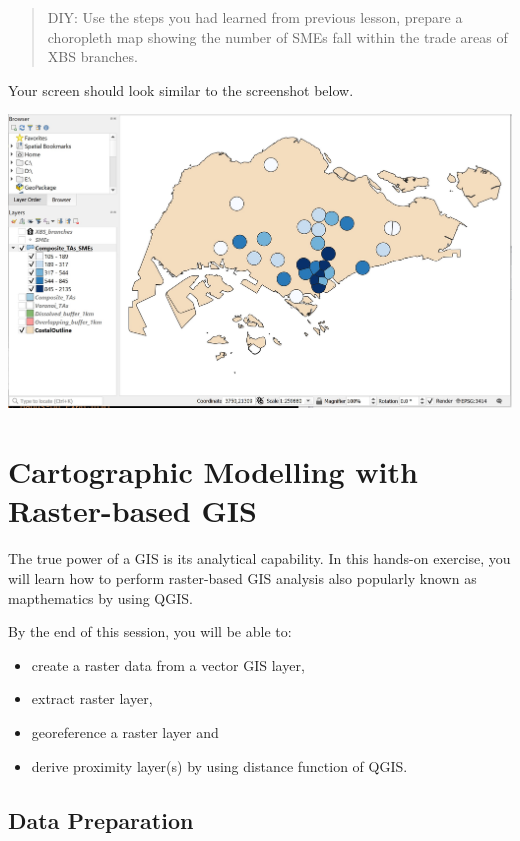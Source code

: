\documentclass[
  letterpaper,
  DIV=11,
  numbers=noendperiod]{scrreprt}
\begin{document}
\begin{quote}
DIY: Use the steps you had learned from previous lesson, prepare a
choropleth map showing the number of SMEs fall within the trade areas of
XBS branches.
\end{quote}

Your screen should look similar to the screenshot below.

\includegraphics{./img05/image28.jpg}


\hypertarget{cartographic-modelling-with-raster-based-gis}{%
\chapter{Cartographic Modelling with Raster-based
GIS}\label{cartographic-modelling-with-raster-based-gis}}

The true power of a GIS is its analytical capability. In this hands-on
exercise, you will learn how to perform raster-based GIS analysis also
popularly known as mapthematics by using QGIS.

By the end of this session, you will be able to:

\begin{itemize}
\item
  create a raster data from a vector GIS layer,
\item
  extract raster layer,
\item
  georeference a raster layer and
\item
  derive proximity layer(s) by using distance function of QGIS.
\end{itemize}

\hypertarget{data-preparation-3}{%
\section{Data Preparation}\label{data-preparation-3}}
\end{document}
